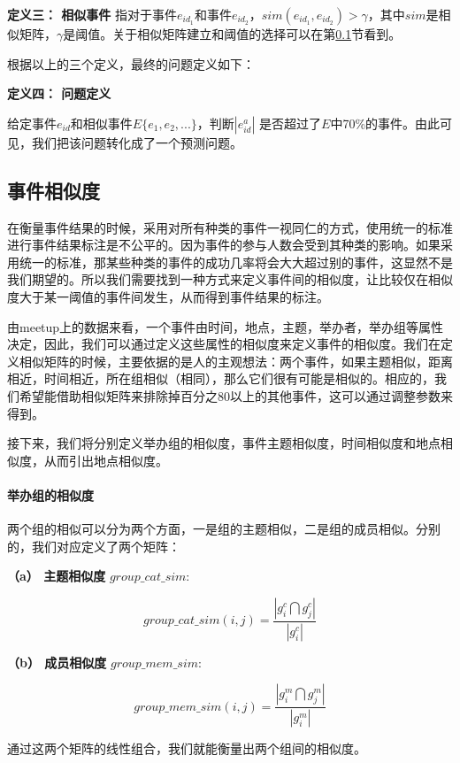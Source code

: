 \textbf{定义三： 相似事件}
指对于事件\(e_{id_1}\)和事件\(e_{id_2}\)，\(sim(e_{id_1},e_{id_2})>\gamma\)，其中\(sim\)是相似矩阵，\(\gamma\)是阈值。关于相似矩阵建立和阈值的选择可以在第\ref{s1-4}节看到。

根据以上的三个定义，最终的问题定义如下：
\newline

\textbf{定义四： 问题定义}

给定事件\(e_{id}\)和相似事件\(E\{e_1,e_2,...\}\)，判断\(|e_{id}^a|\)
是否超过了\(E\)中70\%的事件。由此可见，我们把该问题转化成了一个预测问题。
\subsection{事件相似度}\label{s1-4}
在衡量事件结果的时候，采用对所有种类的事件一视同仁的方式，使用统一的标准进行事件结果标注是不公平的。因为事件的参与人数会受到其种类的影响。如果采用统一的标准，那某些种类的事件的成功几率将会大大超过别的事件，这显然不是我们期望的。所以我们需要找到一种方式来定义事件间的相似度，让比较仅在相似度大于某一阈值的事件间发生，从而得到事件结果的标注。

由meetup上的数据来看，一个事件由时间，地点，主题，举办者，举办组等属性决定，因此，我们可以通过定义这些属性的相似度来定义事件的相似度。我们在定义相似矩阵的时候，主要依据的是人的主观想法：两个事件，如果主题相似，距离相近，时间相近，所在组相似（相同），那么它们很有可能是相似的。相应的，我们希望能借助相似矩阵来排除掉百分之80以上的其他事件，这可以通过调整参数来得到。

接下来，我们将分别定义举办组的相似度，事件主题相似度，时间相似度和地点相似度，从而引出地点相似度。
\paragraph{举办组的相似度}
两个组的相似可以分为两个方面，一是组的主题相似，二是组的成员相似。分别的，我们对应定义了两个矩阵：

\textbf{（a） 主题相似度} \(group\_cat\_sim:\)

\begin{equation}
group\_cat\_sim(i,j)=\frac{|g_i^c\bigcap g_j^c|}{|g_i^c|}
\end{equation}


\textbf{（b） 成员相似度} \(group\_mem\_sim:\)

\begin{equation}
group\_mem\_sim(i,j)=\frac{|g_i^m\bigcap g_j^m|}{|g_i^m|}
\end{equation}

通过这两个矩阵的线性组合，我们就能衡量出两个组间的相似度。

